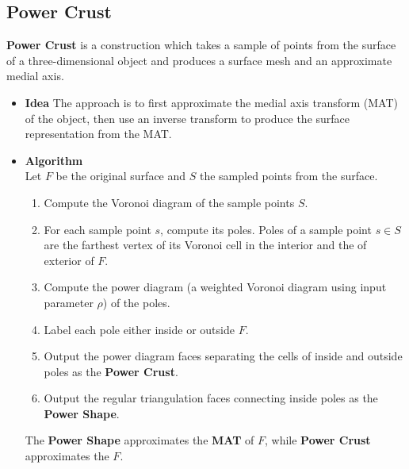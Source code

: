\documentclass[preprint,5p,times,twocolumn]{elsarticle}
\begin{document}
\subsection{Power Crust}
\textbf{Power Crust} \cite{Amenta:2001:PC:376957.376986} is a construction which takes a sample of points from the surface of a three-dimensional object and produces a surface mesh and an approximate medial axis.
\begin{itemize}
	\item \textbf{Idea} The approach is to first approximate the medial axis transform (MAT) of the object, then use an inverse transform to produce the surface representation from the MAT.
	\item \textbf{Algorithm} 
		\\
		Let $F$ be the original surface and $S$ the sampled points from the surface.
        \begin{enumerate}
        \item Compute the Voronoi diagram of the sample points $S$.
		\item For each sample point $s$, compute its poles. Poles of a sample point $s\in S$ are the farthest vertex of its Voronoi cell in the interior and the of exterior of $F$. 
        \item Compute the power diagram (a weighted Voronoi diagram using input parameter $\rho$) of the poles.
        \item Label each pole either inside or outside $F$.
        \item Output the power diagram faces separating the cells of inside and outside poles as the \textbf{Power Crust}.
        \item Output the regular triangulation faces connecting inside poles as the \textbf{Power Shape}.
        \end{enumerate}
		The \textbf{Power Shape} approximates the \textbf{MAT} of $F$, while \textbf{Power Crust} approximates the $F$.
\begin{figure}[!h]
	\centering
\end{figure}
\end{itemize}
\end{document}
